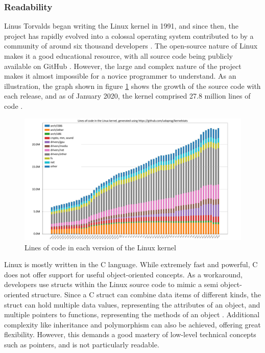 \documentclass[bsc,frontabs,singlespacing,parskip,deptreport]{infthesis}
\begin{document}
\subsubsection{Readability}
Linus Torvalds began writing the Linux kernel in 1991, and since then, the project has rapidly evolved into a colossal operating system contributed to by a community of around six thousand developers \cite{linux-kernel}. The open-source nature of Linux makes it a good educational resource, with all source code being publicly available on GitHub \cite{linux-github}. However, the large and complex nature of the project makes it almost impossible for a novice programmer to understand. As an illustration, the graph shown in figure \ref{linux-growth} shows the growth of the source code with each release, and as of January 2020, the kernel comprised 27.8 million lines of code \cite{linux-loc}.

\begin{figure}[h]
    \centering
    \includegraphics[width=\textwidth]{figures/linux-loc.pdf}
    \caption{Lines of code in each version of the Linux kernel \cite{kernel-stats}}
    \label{linux-growth}
\end{figure}

Linux is mostly written in the C language. While extremely fast and powerful, C does not offer support for useful object-oriented concepts. As a workaround, developers use structs within the Linux source code to mimic a semi object-oriented structure. Since a C struct can combine data items of different kinds, the struct can hold multiple data values, representing the attributes of an object, and multiple pointers to functions, representing the methods of an object \cite{c-struct}. Additional complexity like inheritance and polymorphism can also be achieved, offering great flexibility. However, this demands a good mastery of low-level technical concepts such as pointers, and is not particularly readable. 
\end{document}
